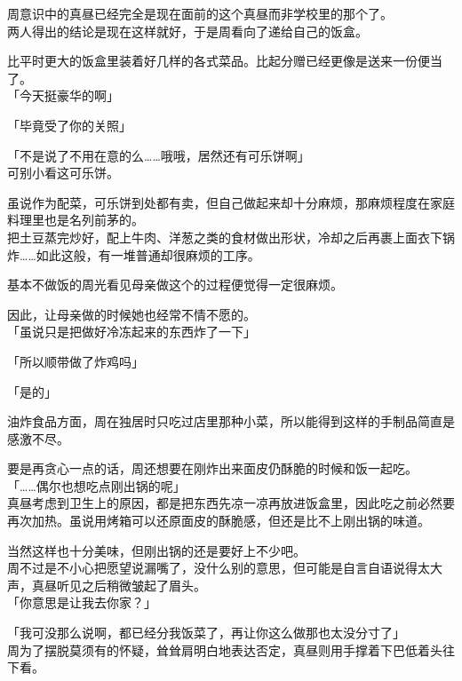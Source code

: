 周意识中的真昼已经完全是现在面前的这个真昼而非学校里的那个了。\\

两人得出的结论是现在这样就好，于是周看向了递给自己的饭盒。

比平时更大的饭盒里装着好几样的各式菜品。比起分赠已经更像是送来一份便当了。\\

「今天挺豪华的啊」

「毕竟受了你的关照」

「不是说了不用在意的么……哦哦，居然还有可乐饼啊」\\

可别小看这可乐饼。

虽说作为配菜，可乐饼到处都有卖，但自己做起来却十分麻烦，那麻烦程度在家庭料理里也是名列前茅的。\\

把土豆蒸完炒好，配上牛肉、洋葱之类的食材做出形状，冷却之后再裹上面衣下锅炸……如此这般，有一堆普通却很麻烦的工序。

基本不做饭的周光看见母亲做这个的过程便觉得一定很麻烦。

因此，让母亲做的时候她也经常不情不愿的。\\

「虽说只是把做好冷冻起来的东西炸了一下」

「所以顺带做了炸鸡吗」

「是的」

油炸食品方面，周在独居时只吃过店里那种小菜，所以能得到这样的手制品简直是感激不尽。

要是再贪心一点的话，周还想要在刚炸出来面皮仍酥脆的时候和饭一起吃。\\

「……偶尔也想吃点刚出锅的呢」\\

真昼考虑到卫生上的原因，都是把东西先凉一凉再放进饭盒里，因此吃之前必然要再次加热。虽说用烤箱可以还原面皮的酥脆感，但还是比不上刚出锅的味道。

当然这样也十分美味，但刚出锅的还是要好上不少吧。\\

周不过是不小心把愿望说漏嘴了，没什么别的意思，但可能是自言自语说得太大声，真昼听见之后稍微皱起了眉头。\\

「你意思是让我去你家？」

「我可没那么说啊，都已经分我饭菜了，再让你这么做那也太没分寸了」\\

周为了摆脱莫须有的怀疑，耸耸肩明白地表达否定，真昼则用手撑着下巴低着头往下看。

